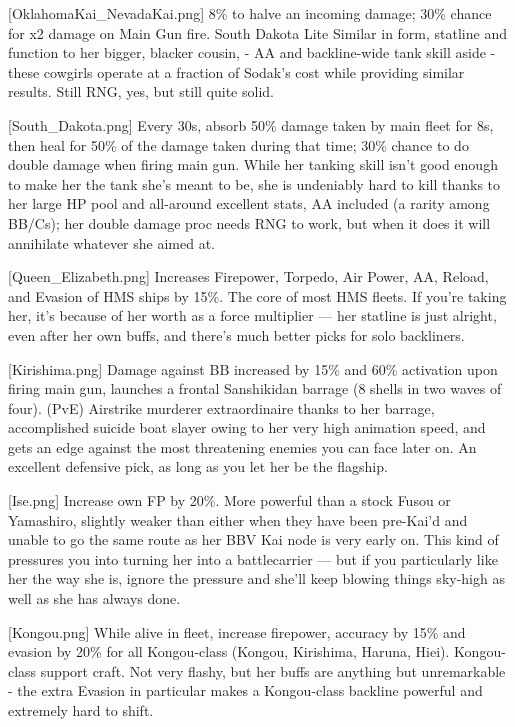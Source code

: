 [OklahomaKai_NevadaKai.png]
{8\% to halve an incoming damage; 30\% chance for x2 damage on Main Gun fire.}
{South Dakota Lite}
{Similar in form, statline and function to her bigger, blacker cousin, - AA and backline-wide tank skill aside - these cowgirls operate at a fraction of Sodak's cost while providing similar results. Still RNG, yes, but still quite solid.}

[South_Dakota.png]
{Every 30s, absorb 50\% damage taken by main fleet for 8s, then heal for 50\% of the damage taken during that time; 30\% chance to do double damage when firing main gun.}
{}
{While her tanking skill isn't good enough to make her the tank she's meant to be, she is undeniably hard to kill thanks to her large HP pool and all-around excellent stats, AA included (a rarity among BB/Cs); her double damage proc needs RNG to work, but when it does it will annihilate whatever she aimed at.}

[Queen_Elizabeth.png]
{Increases Firepower, Torpedo, Air Power, AA, Reload, and Evasion of HMS ships by 15\%.}
{}
{The core of most HMS fleets. If you're taking her, it's because of her worth as a force multiplier --- her statline is just alright, even after her own buffs, and there's much better picks for solo backliners.}

[Kirishima.png]
{Damage against BB increased by 15\% and 60\% activation upon firing main gun, launches a frontal Sanshikidan barrage (8 shells in two waves of four).}
{}{(PvE) Airstrike murderer extraordinaire thanks to her barrage, accomplished suicide boat slayer owing to her very high animation speed, and gets an edge against the most threatening enemies you can face later on. An excellent defensive pick, as long as you let her be the flagship.}

[Ise.png]
{Increase own FP by 20\%.}
{}
{More powerful than a stock Fusou or Yamashiro, slightly weaker than either when they have been pre-Kai'd and unable to go the same route as her BBV Kai node is very early on. This kind of pressures you into turning her into a battlecarrier --- but if you particularly like her the way she is, ignore the pressure and she'll keep blowing things sky-high as well as she has always done.}

[Kongou.png]
{While alive in fleet, increase firepower, accuracy by 15\% and evasion by 20\% for all Kongou-class (Kongou, Kirishima, Haruna, Hiei). }
{}
{Kongou-class support craft. Not very flashy, but her buffs are anything but unremarkable - the extra Evasion in particular makes a Kongou-class backline powerful and extremely hard to shift.}

